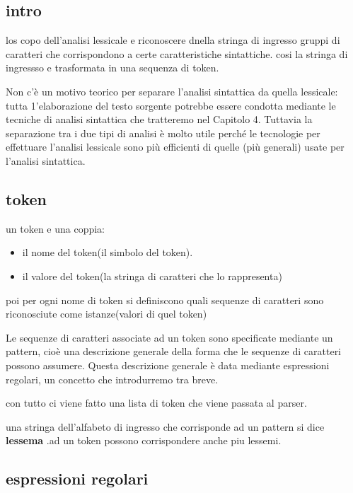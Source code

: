 \documentclass[12pt]{article}
\begin{document}
\subsection{intro}

los copo dell'analisi lessicale e riconoscere dnella stringa di ingresso gruppi di caratteri che corrispondono a certe caratteristiche sintattiche.
cosi la stringa di ingressso e trasformata in una sequenza di token.

Non c'è un motivo teorico per separare l'analisi sintattica da quella lessicale:
tutta 1'elaborazione del testo sorgente potrebbe essere condotta mediante le tecniche
 di analisi sintattica che tratteremo nel Capitolo 4. Tuttavia la separazione tra i
due tipi di analisi è molto utile perché le tecnologie per effettuare l'analisi lessicale sono più efficienti di quelle (più generali) usate per l'analisi sintattica.

\subsection{token}
un token e una coppia:
\begin{itemize}
\item il nome del token(il simbolo del token).
\item   il valore del token(la stringa di caratteri che lo rappresenta)
\end{itemize}

poi per ogni nome di token si definiscono quali sequenze di caratteri sono riconosciute come istanze(valori di quel token)

Le sequenze
di caratteri associate ad un token sono specificate mediante un pattern, cioè una
descrizione generale della forma che le sequenze di caratteri possono assumere.
Questa descrizione generale è data mediante espressioni regolari, un concetto che
introdurremo tra breve.

con tutto ci viene fatto una lista di token che viene passata al parser.

una stringa dell'alfabeto di ingresso che corrisponde ad un pattern si dice \textbf{lessema}
.ad un token possono corrispondere anche piu lessemi.

\subsection{espressioni regolari}
\end{document}
